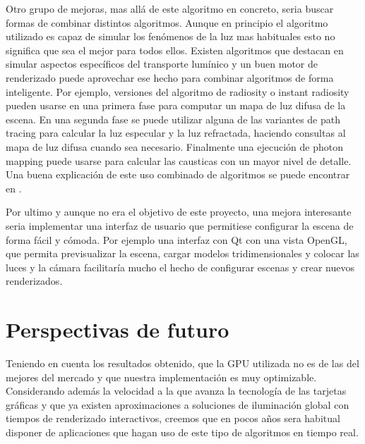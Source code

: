 Otro grupo de mejoras, mas allá de este algoritmo en concreto, seria buscar formas de combinar distintos algoritmos. Aunque en principio el algoritmo utilizado es capaz de simular los fenómenos de la luz mas habituales esto no significa que sea el mejor para todos ellos. Existen algoritmos que destacan en simular aspectos específicos del transporte lumínico y un buen motor de renderizado puede aprovechar ese hecho para combinar algoritmos de forma inteligente. Por ejemplo, versiones del algoritmo de radiosity o instant radiosity pueden usarse en una primera fase para computar un mapa de luz difusa de la escena. En una segunda fase se puede utilizar alguna de las variantes de path tracing para calcular la luz especular y la luz refractada, haciendo consultas al mapa de luz difusa cuando sea necesario. Finalmente una ejecución de photon mapping puede usarse para calcular las causticas con un mayor nivel de detalle.
Una buena explicación de este uso combinado de algoritmos se puede encontrar en \cite{Hery2013}.

\medskip

Por ultimo y aunque no era el objetivo de este proyecto, una mejora interesante seria implementar una interfaz de usuario que permitiese configurar la escena de forma fácil y cómoda. Por ejemplo una interfaz con Qt con una vista OpenGL, que permita previsualizar la escena, cargar modelos tridimensionales y colocar las luces y la cámara facilitaría mucho el hecho de configurar escenas y crear nuevos renderizados.


\section{Perspectivas de futuro}

Teniendo en cuenta los resultados obtenido, que la GPU utilizada no es de las del mejores del mercado y que nuestra implementación es muy optimizable. Considerando además la velocidad a la que avanza la tecnología de las tarjetas gráficas y que ya existen aproximaciones a soluciones de iluminación global con tiempos de renderizado interactivos, creemos que en pocos años sera habitual disponer de aplicaciones que hagan uso de este tipo de algoritmos en tiempo real. 